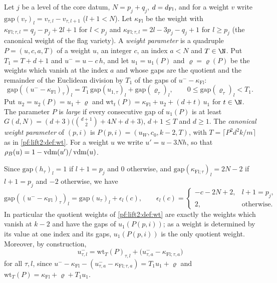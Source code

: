 \begin{definition}\label{pf:lift2:def:wtpar}
Let $j$ be a level of the core datum, $N=p_j+q_j$, $d=d_{\mathrm{Fl}}$, and for a weight $v$ write
$\mathrm{gap}(v_\tau)_l=v_{\tau,l}-v_{\tau,l+1}$ ($l+1<N$). Let $\kappa_{\mathrm{Fl}}$ be the weight with
$\kappa_{\mathrm{Fl};\tau,l}=q_j-p_j+2l+1$ for $l<p_j$ and $\kappa_{\mathrm{Fl};\tau,l}=2l-3p_j-q_j+1$ for $l\ge p_j$ (the
canonical weight of the flag variety). A \emph{weight parameter} is a quadruple $P=(u,c,a,T)$ of a weight $u$, an
integer $c$, an index $a<N$ and $T\in\N$. Put $T_1=T+d+1$ and $u^-=u-c\,h$, and let $u_1=u_1(P)$ and $\varrho=\varrho(P)$
be the weights which vanish at the index $a$ and whose gaps are the quotient and the remainder of the Euclidean
division by $T_1$ of the gaps of $u^--\kappa_{\mathrm{Fl}}$:
\[
\mathrm{gap}((u^--\kappa_{\mathrm{Fl}})_\tau)_l=T_1\,\mathrm{gap}(u_{1,\tau})_l+\mathrm{gap}(\varrho_\tau)_l,\qquad
0\le\mathrm{gap}(\varrho_\tau)_l<T_1 .
\]
Put $u_2=u_2(P)=u_1+\varrho$ and $\mathrm{wt}_t(P)=\kappa_{\mathrm{Fl}}+u_2+(d+t)\,u_1$ for $t\in\N$. The parameter $P$ is
\emph{large} if every consecutive gap of $u_1(P)$ is at least
$G(d,N)=(d+3)\bigl(\binom{d+1}2+4N+d+3\bigr)$, $d+1\le T$ and $d\ge1$. The \emph{canonical weight parameter} of $(p,i)$
is $P(p,i)=(u_W,c_0,k-2,T)$, with $T=\lceil P^2d^2k/m\rceil$ as in \cref{pf:lift2:def:wt}. For a weight $u$ we write
$u'=u-3Nh$, so that $\rho_B(u)=1-\operatorname{vdm}(u')/\operatorname{vdm}(u)$.
\end{definition}

Since $\mathrm{gap}(h_\tau)_l=1$ if $l+1=p_j$ and $0$ otherwise, and $\mathrm{gap}(\kappa_{\mathrm{Fl};\tau})_l=2N-2$ if
$l+1=p_j$ and $-2$ otherwise, we have
\begin{equation}\label{eq:pf:lift2:gapminus}
\mathrm{gap}((u^--\kappa_{\mathrm{Fl}})_\tau)_l=\mathrm{gap}(u_\tau)_l+\epsilon_l(c),\qquad
\epsilon_l(c)=\begin{cases}-c-2N+2,&l+1=p_j,\\2,&\text{otherwise}.\end{cases}
\end{equation}
In particular the quotient weights of \cref{pf:lift2:def:wt} are exactly the weights which vanish at $k-2$ and have the
gaps of $u_1(P(p,i))$; as a weight is determined by its value at one index and its gaps, $u_1(P(p,i))$ is the only
quotient weight. Moreover, by construction,
\begin{equation}\label{eq:pf:lift2:uminus}
u^-_{\tau,l}=\mathrm{wt}_T(P)_{\tau,l}+\bigl(u^-_{\tau,a}-\kappa_{\mathrm{Fl};\tau,a}\bigr)
\end{equation}
for all $\tau,l$, since $u^--\kappa_{\mathrm{Fl}}-(u^-_{\tau,a}-\kappa_{\mathrm{Fl};\tau,a})=T_1u_1+\varrho$ and
$\mathrm{wt}_T(P)=\kappa_{\mathrm{Fl}}+\varrho+T_1u_1$.

